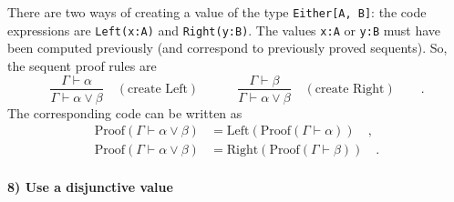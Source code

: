 There are two ways of creating a value of the type \lstinline!Either[A, B]!:
the code expressions are \lstinline!Left(x:A)!
and \lstinline!Right(y:B)!.
The values \lstinline!x:A!
or \lstinline!y:B! must
have been computed previously (and correspond to previously proved
sequents). So, the sequent proof rules are
\[
\frac{\Gamma\vdash\alpha}{\Gamma\vdash\alpha\vee\beta}\quad(\text{create Left})\quad\quad\quad\frac{\Gamma\vdash\beta}{\Gamma\vdash\alpha\vee\beta}\quad(\text{create Right})\quad\quad.
\]
The corresponding code can be written as 
\begin{align*}
\text{Proof}\left(\Gamma\vdash\alpha\vee\beta\right) & =\text{Left}(\text{Proof}\left(\Gamma\vdash\alpha\right))\quad,\\
\text{Proof}\left(\Gamma\vdash\alpha\vee\beta\right) & =\text{Right}(\text{Proof}\left(\Gamma\vdash\beta\right))\quad.
\end{align*}


\paragraph{8) Use a disjunctive value}

